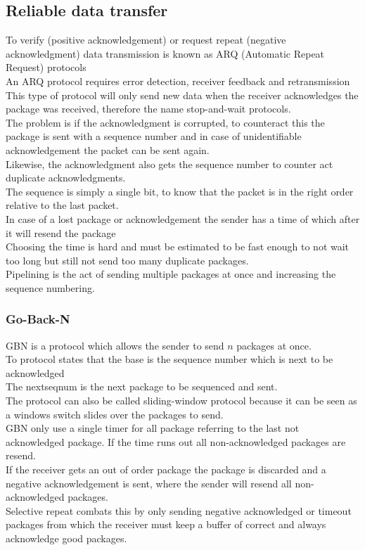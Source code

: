 \documentclass[12pt, a4paper]{article}
\begin{document}
		\subsection{Reliable data transfer}
			To verify (positive acknowledgement) or request repeat (negative acknowledgment) data transmission is known as ARQ (Automatic Repeat Request) protocols\\
			An ARQ protocol requires error detection, receiver feedback and retransmission\\
			This type of protocol will only send new data when the receiver acknowledges the package was received, therefore the name stop-and-wait protocols.\\
			The problem is if the acknowledgment is corrupted, to counteract this the package is sent with a sequence number and in case of unidentifiable acknowledgement the packet can be sent again.\\
			Likewise, the acknowledgment also gets the sequence number to counter act duplicate acknowledgments.\\
			The sequence is simply a single bit, to know that the packet is in the right order relative to the last packet.\\
			In case of a lost package or acknowledgement the sender has a time of which after it will resend the package\\
			Choosing the time is hard and must be estimated to be fast enough to not wait too long but still not send too many duplicate packages.\\
			Pipelining is the act of sending multiple packages at once and increasing the sequence numbering.
			\subsubsection{Go-Back-N}
				GBN is a protocol which allows the sender to send $n$ packages at once.\\
				To protocol states that the base is the sequence number which is next to be acknowledged\\
				The nextseqnum is the next package to be sequenced and sent.\\
				The protocol can also be called sliding-window protocol because it can be seen as a windows switch slides over the packages to send.\\
				GBN only use a single timer for all package referring to the last not acknowledged package. If the time runs out all non-acknowledged packages are resend.\\
				If the receiver gets an out of order package the package is discarded and a negative acknowledgement is sent, where the sender will resend all non-acknowledged packages.\\
				Selective repeat combats this by only sending negative acknowledged or timeout packages from which the receiver must keep a buffer of correct and always acknowledge good packages.\\
\end{document}
